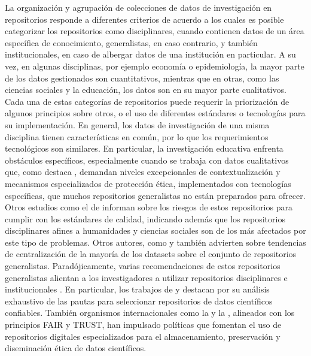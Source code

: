 \documentclass[runningheads]{llncs}
\begin{document}
La organización y agrupación de colecciones de datos de investigación en repositorios responde a diferentes criterios de acuerdo a los cuales es posible categorizar los repositorios como disciplinares, cuando contienen datos 
de un área específica de conocimiento, generalistas, en caso contrario, y también institucionales, en caso de albergar datos de una institución en particular. %
A su vez, en algunas disciplinas, por ejemplo economía o epidemiología, la mayor parte de los datos gestionados son cuantitativos, mientras que en otras, como las ciencias sociales y la educación, los datos son en su mayor parte cualitativos. Cada una de estas categorías de repositorios puede requerir la priorización de algunos principios sobre otros, o el uso de diferentes estándares o tecnologías para su implementación. En general, los datos de investigación de una misma disciplina tienen características en común, por lo que los requerimientos tecnológicos son similares. %
En particular, la investigación educativa enfrenta obstáculos específicos, especialmente cuando se trabaja con datos cualitativos que, como destaca \citep{antonio}, demandan niveles excepcionales de contextualización y mecanismos especializados de protección ética, implementados con tecnologías específicas, que muchos repositorios generalistas no están preparados para ofrecer.   
Otros estudios como el de \citep{strecker_disappearing_repos_23} informan sobre los riesgos de estos repositorios para cumplir con los estándares de calidad, indicando además que los repositorios disciplinares afines a humanidades y ciencias sociales son de los más afectados por este tipo de problemas. Otros autores, como \citep{google_dataset_aglomeration} y \citep{ Gerasimov2024} también advierten sobre tendencias de centralización de la mayoría de los datasets sobre el conjunto de repositorios generalistas. Paradójicamente, varias recomendaciones de estos repositorios generalistas alientan a los investigadores a utilizar repositorios disciplinares e institucionales \cite{barbosa_2024_11105430}.
En particular, los trabajos de \citep{Jia25} y \citep{avila2024} destacan por su análisis exhaustivo de las pautas para seleccionar repositorios de datos científicos confiables. 
También organismos internacionales como la \cite{unesco2021} y la \cite{oecd2020}, alineados con los principios FAIR y TRUST, han impulsado políticas que fomentan el uso de repositorios digitales especializados para el almacenamiento, preservación y diseminación ética de datos científicos. 
\end{document}
